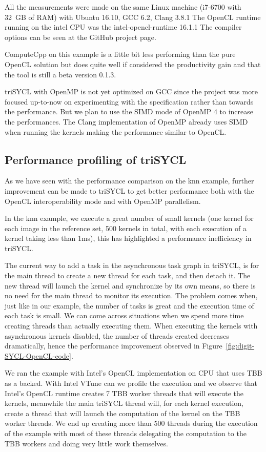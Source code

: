 \documentclass[sigplan]{acmart}
\begin{document}
All the measurements were made on the same Linux machine (i7-6700
with 32~GB of RAM) with Ubuntu 16.10, GCC 6.2, Clang 3.8.1
The OpenCL runtime running on the intel CPU was the intel-opencl-runtime 16.1.1
The compiler options can be seen at the GitHub project page.

ComputeCpp on this example is a little bit less performing than the
pure OpenCL solution but does quite well if considered the
productivity gain and that the tool is still a beta version 0.1.3.

triSYCL with OpenMP is not yet optimized on GCC since the project was more
focused up-to-now on experimenting with the specification rather than
towards the performance. But we plan to use the SIMD mode of OpenMP 4
to increase the performances. The Clang implementation of OpenMP already
uses SIMD when running the kernels making the performance similar to OpenCL.


\subsection{Performance profiling of triSYCL}
\label{sec:profiling}
As we have seen with the performance comparison on the knn example,
further improvement can be made to triSYCL to get better performance
both with the OpenCL interoperability mode and with OpenMP parallelism.

In the knn example, we execute a great number of small kernels
(one kernel for each image in the reference set, 500 kernels in total,
with each execution of a kernel taking less than 1ms),
this has highlighted a performance inefficiency in triSYCL.

The current way to add a task in the asynchronous task graph in triSYCL,
is for the main thread to create a new thread for each task,
and then detach it. The new thread will launch the kernel and synchronize by
its own means, so there is no need for the main thread to monitor
its execution. The problem comes when, just like in our example,
the number of tasks is great and the execution time of each task is small.
We can come across situations when we spend more time creating threads
than actually executing them. When executing the kernels with asynchronous 
kernels disabled, the number of threads created decreases dramatically, 
hence the performance improvement observed 
in Figure~\ref{fig:digit-SYCL-OpenCL-code}. 

We ran the example with Intel's OpenCL implementation on CPU that uses TBB
as a backed. With Intel VTune can we profile the execution and we observe
that Intel's OpenCL runtime creates 7 TBB worker threads that will execute
the kernels, meanwhile the main triSYCL thread will, for each kernel execution,
create a thread that will launch the computation of the kernel on the
TBB worker threads. We end up creating more than 500 threads during the
execution of the example with most of these threads delegating the computation
to the TBB workers and doing very little work themselves.
\end{document}
